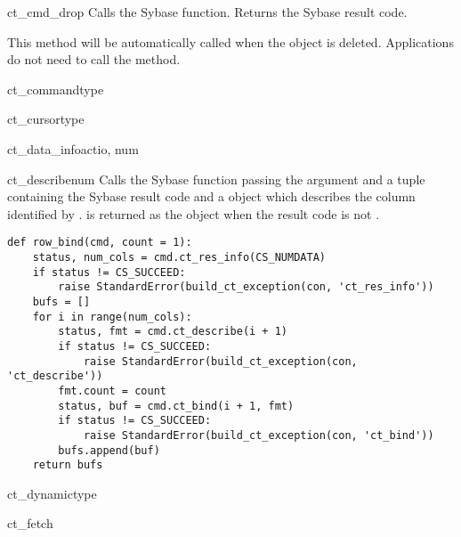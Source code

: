\begin{methoddesc}[CS_COMMAND]{ct_cmd_drop}{}
Calls the Sybase  function.  Returns the
Sybase result code.

This method will be automatically called when the 
object is deleted.  Applications do not need to call the method.
\end{methoddesc}

\begin{methoddesc}[CS_COMMAND]{ct_command}{type \optional{, \ldots}}
\end{methoddesc}

\begin{methoddesc}[CS_COMMAND]{ct_cursor}{type \optional{, \ldots}}
\end{methoddesc}

\begin{methoddesc}[CS_COMMAND]{ct_data_info}{actio, num }
\end{methoddesc}

\begin{methoddesc}[CS_COMMAND]{ct_describe}{num}
Calls the Sybase  function passing the
 argument and a tuple containing the Sybase result code and
a  object which describes the column identified by
.  is returned as the  object
when the result code is not .

\begin{verbatim}
def row_bind(cmd, count = 1):
    status, num_cols = cmd.ct_res_info(CS_NUMDATA)
    if status != CS_SUCCEED:
        raise StandardError(build_ct_exception(con, 'ct_res_info'))
    bufs = []
    for i in range(num_cols):
        status, fmt = cmd.ct_describe(i + 1)
        if status != CS_SUCCEED:
            raise StandardError(build_ct_exception(con, 'ct_describe'))
        fmt.count = count
        status, buf = cmd.ct_bind(i + 1, fmt)
        if status != CS_SUCCEED:
            raise StandardError(build_ct_exception(con, 'ct_bind'))
        bufs.append(buf)
    return bufs
\end{verbatim}
\end{methoddesc}

\begin{methoddesc}[CS_COMMAND]{ct_dynamic}{type \optional{, \ldots}}
\end{methoddesc}

\begin{methoddesc}[CS_COMMAND]{ct_fetch}{}
\end{methoddesc}


